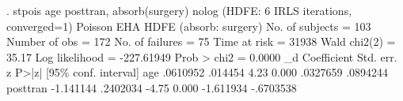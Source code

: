 . stpois age posttran, absorb(surgery) nolog
  (HDFE: 6 IRLS iterations, converged=1)
{\smallskip}
Poisson EHA {\EMDASH} HDFE (absorb: surgery)
{\smallskip}
No. of subjects =          103                  Number of obs   =      172
No. of failures =           75
Time at risk    =        31938                  Wald chi2(2)    =    35.17
Log likelihood  =   -227.61949                  Prob > chi2     =   0.0000
{\smallskip}
          _d {\VBAR} Coefficient  Std. err.      z    P>|z|     [95\% conf. interval]
         age {\VBAR}   .0610952    .014454     4.23   0.000     .0327659    .0894244
    posttran {\VBAR}  -1.141144   .2402034    -4.75   0.000    -1.611934   -.6703538
